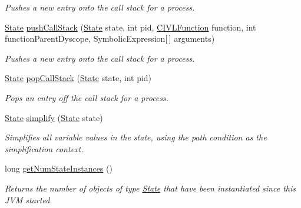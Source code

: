 \begin{DoxyCompactItemize}
\begin{DoxyCompactList}\small\item\em Pushes a new entry onto the call stack for a process. \end{DoxyCompactList}\item 
\hyperlink{interfaceedu_1_1udel_1_1cis_1_1vsl_1_1civl_1_1state_1_1IF_1_1State}{State} \hyperlink{interfaceedu_1_1udel_1_1cis_1_1vsl_1_1civl_1_1state_1_1IF_1_1StateFactory_a8eae26822f75dc67b3a588a725af7430}{push\+Call\+Stack} (\hyperlink{interfaceedu_1_1udel_1_1cis_1_1vsl_1_1civl_1_1state_1_1IF_1_1State}{State} state, int pid, \hyperlink{interfaceedu_1_1udel_1_1cis_1_1vsl_1_1civl_1_1model_1_1IF_1_1CIVLFunction}{C\+I\+V\+L\+Function} function, int function\+Parent\+Dyscope, Symbolic\+Expression\mbox{[}$\,$\mbox{]} arguments)
\begin{DoxyCompactList}\small\item\em Pushes a new entry onto the call stack for a process. \end{DoxyCompactList}\item 
\hyperlink{interfaceedu_1_1udel_1_1cis_1_1vsl_1_1civl_1_1state_1_1IF_1_1State}{State} \hyperlink{interfaceedu_1_1udel_1_1cis_1_1vsl_1_1civl_1_1state_1_1IF_1_1StateFactory_ab11e79aef8f8b8b80e830cbf48f03c1e}{pop\+Call\+Stack} (\hyperlink{interfaceedu_1_1udel_1_1cis_1_1vsl_1_1civl_1_1state_1_1IF_1_1State}{State} state, int pid)
\begin{DoxyCompactList}\small\item\em Pops an entry off the call stack for a process. \end{DoxyCompactList}\item 
\hyperlink{interfaceedu_1_1udel_1_1cis_1_1vsl_1_1civl_1_1state_1_1IF_1_1State}{State} \hyperlink{interfaceedu_1_1udel_1_1cis_1_1vsl_1_1civl_1_1state_1_1IF_1_1StateFactory_adbeb8d17faccb408984c62646ad3491d}{simplify} (\hyperlink{interfaceedu_1_1udel_1_1cis_1_1vsl_1_1civl_1_1state_1_1IF_1_1State}{State} state)
\begin{DoxyCompactList}\small\item\em Simplifies all variable values in the state, using the path condition as the simplification context. \end{DoxyCompactList}\item 
long \hyperlink{interfaceedu_1_1udel_1_1cis_1_1vsl_1_1civl_1_1state_1_1IF_1_1StateFactory_a2e8deab13e632331d44f30808e245bd3}{get\+Num\+State\+Instances} ()
\begin{DoxyCompactList}\small\item\em Returns the number of objects of type \hyperlink{interfaceedu_1_1udel_1_1cis_1_1vsl_1_1civl_1_1state_1_1IF_1_1State}{State} that have been instantiated since this J\+V\+M started. \end{DoxyCompactList}\item 

\end{DoxyCompactItemize}
